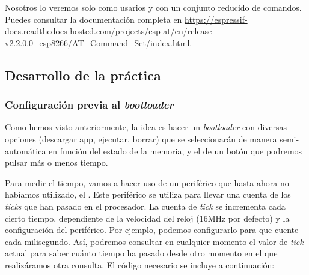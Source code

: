 \documentclass[../main.tex]{subfiles}
\begin{document}
            Nosotros lo veremos solo como usarios y con un conjunto reducido de comandos. Puedes consultar la documentación completa en \url{https://espressif-docs.readthedocs-hosted.com/projects/esp-at/en/release-v2.2.0.0_esp8266/AT_Command_Set/index.html}.
       

    \subsection{Desarrollo de la práctica}

        \subsubsection{Configuración previa al \emph{bootloader}}

            Como hemos visto anteriormente, la idea es hacer un \emph{bootloader} con diversas opciones (descargar app, ejecutar, borrar) que se seleccionarán de manera semi-automática en función del estado de la memoria, y el de un botón que podremos pulsar más o menos tiempo.

            Para medir el tiempo, vamos a hacer uso de un periférico que hasta ahora no habíamos utilizado, el  \PMMAN[4.4]. Este periférico se utiliza para llevar una cuenta de los \emph{ticks} que han pasado en el procesador. La cuenta de \emph{tick} se incrementa cada cierto tiempo, dependiente de la velocidad del reloj (16MHz por defecto) y la configuración del periférico. Por ejemplo, podemos configurarlo para que cuente cada milisegundo. Así, podremos consultar en cualquier momento el valor de \emph{tick} actual para saber cuánto tiempo ha pasado desde otro momento en el que realizáramos otra consulta. El código necesario se incluye a continuación:
\end{document}

